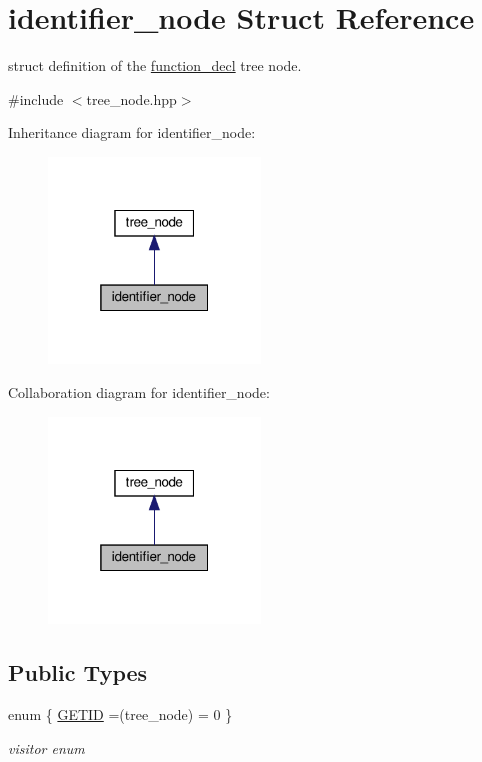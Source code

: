 \hypertarget{structidentifier__node}{}\section{identifier\+\_\+node Struct Reference}
\label{structidentifier__node}


struct definition of the \hyperlink{structfunction__decl}{function\+\_\+decl} tree node.  




{\ttfamily \#include $<$tree\+\_\+node.\+hpp$>$}



Inheritance diagram for identifier\+\_\+node\+:
\nopagebreak
\begin{figure}[H]
\begin{center}
\leavevmode
\includegraphics[width=160pt]{d7/d89/structidentifier__node__inherit__graph}
\end{center}
\end{figure}


Collaboration diagram for identifier\+\_\+node\+:
\nopagebreak
\begin{figure}[H]
\begin{center}
\leavevmode
\includegraphics[width=160pt]{d6/d43/structidentifier__node__coll__graph}
\end{center}
\end{figure}
\subsection*{Public Types}
\begin{DoxyCompactItemize}
\item 
enum \{ \hyperlink{structidentifier__node_aab43b68bbc7d3eebefc80cf928aba0e2a7e1e268c95426a86bc297b0e3585d722}{G\+E\+T\+ID} =(tree\+\_\+node) = 0
 \}\begin{DoxyCompactList}\small\item\em visitor enum \end{DoxyCompactList}
\end{DoxyCompactItemize}
